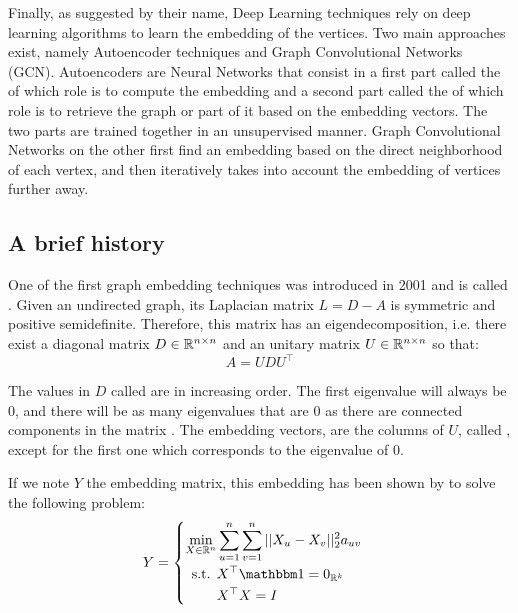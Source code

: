 Finally, as suggested by their name, Deep Learning techniques rely on deep learning algorithms to learn the embedding of the vertices. Two main approaches exist, namely Autoencoder techniques and Graph Convolutional Networks (GCN). Autoencoders are Neural Networks that consist in a first part called the  of which role is to compute the embedding and a second part called the  of which role is to retrieve the graph or part of it based on the embedding vectors. The two parts are trained together in an unsupervised manner. Graph Convolutional Networks on the other first find an embedding based on the direct neighborhood of each vertex, and then iteratively takes into account the embedding of vertices further away.

\subsection{A brief history}\label{subsec:embedding_history}
One of the first graph embedding techniques was introduced in 2001 and is called  \cite{belkin2001_spectralEmbedding}. Given an undirected graph, its Laplacian matrix $ L = D - A$ is symmetric and positive semidefinite. Therefore, this matrix has an eigendecomposition, i.e. there exist a diagonal matrix $D \in \mathbb{R}^{n\times n}$ and an unitary matrix $U \in \mathbb{R}^{n \times n}$ so that:
\begin{equation}
    A = U D U^\top
\end{equation}

The values in $D$ called  are in increasing order. The first eigenvalue will always be $0$, and there will be as many eigenvalues that are $0$ as there are connected components in the matrix \cite{belkin2001_spectralEmbedding}. The embedding vectors, are the columns of $U$, called , except for the first one which corresponds to the eigenvalue of 0.

If we note $Y$ the embedding matrix, this embedding has been shown by \cite{belkin2001_spectralEmbedding} to solve the following problem:
\begin{equation}
    Y = \begin{cases}
    \begin{aligned}
        \min_{X \in \realset^n} &\sum_{u = 1}^n\sum_{v=1}^n ||X_u - X_v||_2^2a_{uv}\\
        \text{s.t.  } & X^\top \ones = \zeros{\realset^k}\\
                    & X^\top X = I
    \end{aligned}
    \end{cases}
\end{equation}

